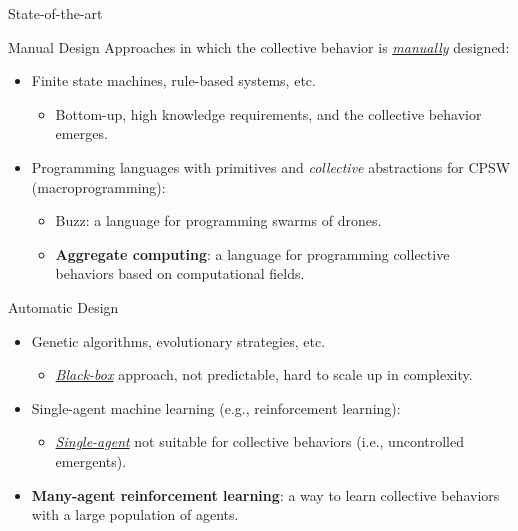 \documentclass[presentation, 9pt,169]{beamer}\mode<presentation>{\usetheme{AMSBolognaFC}}
\begin{document}
\begin{frame}{State-of-the-art}

  \begin{exampleblock}{Manual Design}
    Approaches in which the collective behavior is \emph{\underline{manually}} designed:
    \begin{itemize}
      \item Finite state machines, rule-based systems, etc.
        \begin{itemize}
          \item Bottom-up, high knowledge requirements, and the collective behavior emerges.
        \end{itemize}
      \item Programming languages with primitives and \emph{collective} abstractions for CPSW (macroprogramming):
        \begin{itemize}
          \item Buzz: a language for programming swarms of drones.
          \item \textbf{Aggregate computing}: a language for programming collective behaviors based on computational fields.
        \end{itemize}
    \end{itemize}  
  \end{exampleblock}

  \begin{exampleblock}{Automatic Design}
    \begin{itemize}
      \item Genetic algorithms, evolutionary strategies, etc.
        \begin{itemize}
          \item \emph{\underline{Black-box}} approach, not predictable, hard to scale up in complexity.
        \end{itemize}
      \item Single-agent machine learning (e.g., reinforcement learning):
        \begin{itemize}
          \item \emph{\underline{Single-agent}} not suitable for collective behaviors (i.e., uncontrolled emergents).
        \end{itemize}
      \item \textbf{Many-agent reinforcement learning}: a way to learn collective behaviors with a large population of agents.
    \end{itemize}
  \end{exampleblock}
\end{frame}
\end{document}

